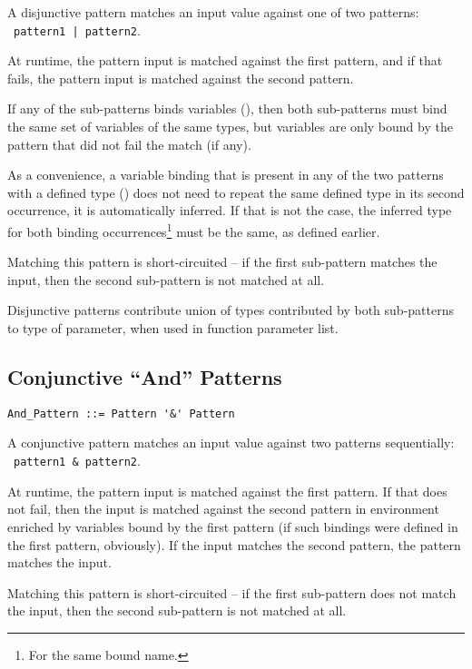 A disjunctive pattern matches an input value against one of two patterns: ~\lstinline!pattern1 | pattern2!. 

At runtime, the pattern input is matched against the first pattern, and if that fails, the pattern input is matched against the second pattern. 

If any of the sub-patterns binds variables (), then both sub-patterns must bind the same set of variables of the same types, but variables are only bound by the pattern that did not fail the match (if any). 

As a convenience, a variable binding that is present in any of the two patterns with a defined type () does not need to repeat the same defined type in its second occurrence, it is automatically inferred. If that is not the case, the inferred type for both binding occurrences\footnote{For the same bound name.} must be the same, as defined earlier. 

Matching this pattern is short-circuited -- if the first sub-pattern matches the input, then the second sub-pattern is not matched at all. 

Disjunctive patterns contribute union of types contributed by both sub-patterns to type of parameter, when used in function parameter list. 





\subsection{Conjunctive ``And'' Patterns}
\label{sec:conjunctive-patterns}

\syntax\begin{lstlisting}
And_Pattern ::= Pattern '&' Pattern
\end{lstlisting}

A conjunctive pattern matches an input value against two patterns sequentially: ~\lstinline!pattern1 & pattern2!. 

At runtime, the pattern input is matched against the first pattern. If that does not fail, then the input is matched against the second pattern in environment enriched by variables bound by the first pattern (if such bindings were defined in the first pattern, obviously). If the input matches the second pattern, the pattern matches the input. 

Matching this pattern is short-circuited -- if the first sub-pattern does not match the input, then the second sub-pattern is not matched at all. 

